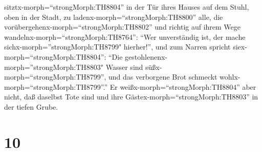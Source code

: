 sitztx-morph=``strongMorph:TH8804'' in der Tür ihres Hauses auf dem
Stuhl, oben in der Stadt,  zu
ladenx-morph=``strongMorph:TH8800'' alle, die
vorübergehenx-morph=``strongMorph:TH8802'' und richtig auf ihrem Wege
wandelnx-morph=``strongMorph:TH8764'':  ``Wer unverständig
ist, der mache sichx-morph=''strongMorph:TH8799" hierher!'', und zum
Narren spricht siex-morph=``strongMorph:TH8804'':  ``Die
gestohlenenx-morph=''strongMorph:TH8803" Wasser sind
süßx-morph=``strongMorph:TH8799'', und das verborgene Brot schmeckt
wohlx-morph=``strongMorph:TH8799''.''  Er
weißx-morph=``strongMorph:TH8804'' aber nicht, daß daselbst Tote sind
und ihre Gästex-morph=``strongMorph:TH8803'' in der tiefen Grube.

\hypertarget{section-9}{%
\section{10}\label{section-9}}

